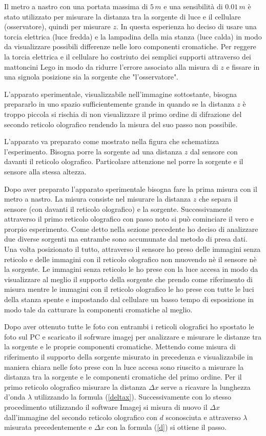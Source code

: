 Il metro a nastro con una portata massima di $5\, m$ e una sensibilità di $0.01\,m$ è stato utilizzato per misurare la distanza tra la sorgente di luce e il cellulare (osservatore), quindi per misurare $z$. In questa esperienza ho deciso di usare una torcia elettrica (luce fredda) e la lampadina della mia stanza (luce calda) in modo da visualizzare possibili differenze nelle loro componenti cromatiche. Per reggere la torcia elettrica e il cellulare ho costriuto dei semplici supporti attraverso dei mattoncini Lego in modo da ridurre l'errore associato alla misura di $z$ e fissare in una signola posizione sia la sorgente che "l'osservatore".

L'apparato sperimentale, visualizzabile nell'immagine sottostante, bisogna prepararlo in uno spazio sufficientemente grande in quando se la distanza $z$ è troppo piccola si rischia di non visualizzare il primo ordine di difrazione del secondo reticolo olografico rendendo la misura del suo passo non possibile.

L'apparato va preparato come mostrato nella figura che schematizza l'esperimento. Bisogna porre la sorgente ad una distanza $z$ dal sensore con davanti il reticolo olografico. Particolare attenzione nel porre la sorgente e il sensore alla stessa altezza.

Dopo aver preparato l'apparato sperimentale bisogna fare la prima misura con il metro a nastro. La misura consiste nel misurare la distanza $z$ che separa il sensore (con davanti il reticolo olografico) e la sorgente. Successivamente attraverso il primo reticolo olografico con passo noto si può cominciare il vero e prorpio esperimento. Come detto nella sezione precedente ho deciso di analizzare due diverse sorgenti ma entrambe sono accumunate dal metodo di presa dati. Una volta posizionato il tutto, attraverso il sensore ho preso delle immagini senza reticolo e delle immagini con il reticolo olografico non muovendo nè il sensore nè la sorgente. Le immagini senza reticolo le ho prese con la luce accesa in modo da visualizzare al meglio il supporto della sorgente che prendo come riferimento di misura mentre le immagini con il reticolo olografico le ho prese con tutte le luci della stanza spente e impostando dal cellulare un basso tempo di esposizione in modo tale da catturare la componenti cromatiche al meglio. 

Dopo aver ottenuto tutte le foto con entrambi i reticoli olografici ho spostato le foto sul PC e scaricato il sofrware imagej per analizzare e misurare le distanze tra la sorgente e le proprie componenti cromatiche. Mettendo come misura di riferimento il supporto della sorgente misurato in precedenza e visualizzabile in maniera chiara nelle foto prese con la luce accesa sono riuscito a misurare la distanza tra la sorgente e le componenti cromatiche del primo ordine. Per il primo reticolo olografico misurare la distanza $\Delta x$ serve a ricavare la lunghezza d'onda $\lambda$ utilizzando la formula (\ref{deltax}). Successivamente con lo stesso procedimento utilizzando il software Imagej si misura di nuovo il $\Delta x$ dall'immagine del secondo reticolo olografico con $d$ sconosciuta e attraverso $\lambda$ misurata precedentemente e $\Delta x$ con la formula (\ref{d}) si ottiene il passo.